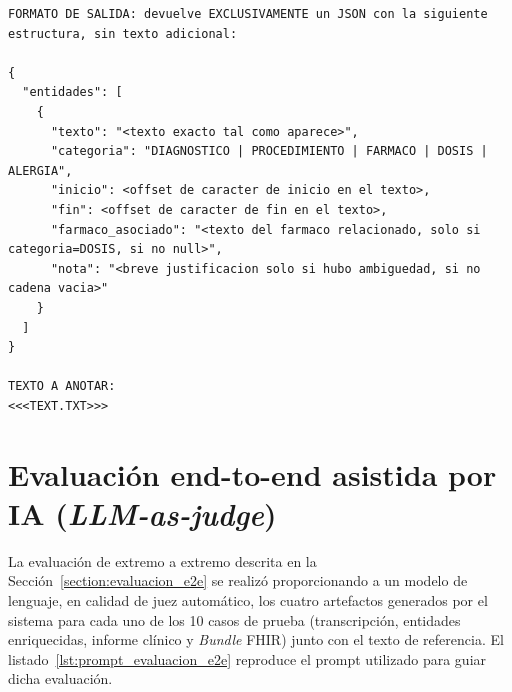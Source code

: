 \begin{lstlisting}
FORMATO DE SALIDA: devuelve EXCLUSIVAMENTE un JSON con la siguiente estructura, sin texto adicional:

{
  "entidades": [
    {
      "texto": "<texto exacto tal como aparece>",
      "categoria": "DIAGNOSTICO | PROCEDIMIENTO | FARMACO | DOSIS | ALERGIA",
      "inicio": <offset de caracter de inicio en el texto>,
      "fin": <offset de caracter de fin en el texto>,
      "farmaco_asociado": "<texto del farmaco relacionado, solo si categoria=DOSIS, si no null>",
      "nota": "<breve justificacion solo si hubo ambiguedad, si no cadena vacia>"
    }
  ]
}

TEXTO A ANOTAR:
<<<TEXT.TXT>>>
\end{lstlisting}

\section{Evaluación end-to-end asistida por IA (\textit{LLM-as-judge})}\label{section:anexo_prompt_evaluacion}

La evaluación de extremo a extremo descrita en la Sección~\ref{section:evaluacion_e2e} se realizó
proporcionando a un modelo de lenguaje, en calidad de juez automático, los cuatro artefactos
generados por el sistema para cada uno de los 10 casos de prueba (transcripción, entidades
enriquecidas, informe clínico y \textit{Bundle} FHIR) junto con el texto de referencia. El
listado~\ref{lst:prompt_evaluacion_e2e} reproduce el prompt utilizado para guiar dicha evaluación.

